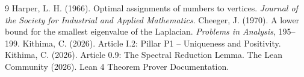 \documentclass[11pt,a4paper]{article}
\begin{document}

\begin{thebibliography}{9}
  Harper, L. H. (1966). Optimal assignments of numbers to vertices. \emph{Journal of the Society for Industrial and Applied Mathematics}.
  Cheeger, J. (1970). A lower bound for the smallest eigenvalue of the Laplacian. \emph{Problems in Analysis}, 195–199.
  Kithima, C. (2026). Article I.2: Pillar P1 – Uniqueness and Positivity.
  Kithima, C. (2026). Article 0.9: The Spectral Reduction Lemma.
  The Lean Community (2026). Lean 4 Theorem Prover Documentation.
\end{thebibliography}
\end{document}
